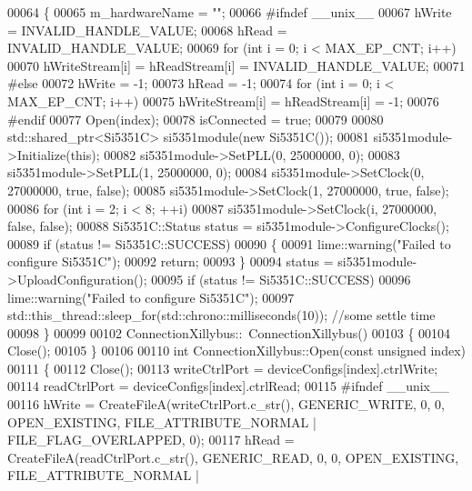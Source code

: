 \begin{DoxyCode}
00064 \{
00065     m\_hardwareName = \textcolor{stringliteral}{""};
00066 \textcolor{preprocessor}{#ifndef \_\_unix\_\_}
00067     hWrite = INVALID\_HANDLE\_VALUE;
00068     hRead = INVALID\_HANDLE\_VALUE;
00069     \textcolor{keywordflow}{for} (\textcolor{keywordtype}{int} i = 0; i < MAX\_EP\_CNT; i++)
00070         hWriteStream[i] = hReadStream[i] = INVALID\_HANDLE\_VALUE;
00071 \textcolor{preprocessor}{#else}
00072     hWrite = -1;
00073     hRead = -1;
00074     \textcolor{keywordflow}{for} (\textcolor{keywordtype}{int} i = 0; i < MAX\_EP\_CNT; i++)
00075         hWriteStream[i] = hReadStream[i] = -1;
00076 \textcolor{preprocessor}{#endif}
00077     Open(index);
00078     isConnected = \textcolor{keyword}{true};
00079 
00080     std::shared\_ptr<Si5351C> si5351module(\textcolor{keyword}{new} Si5351C());
00081     si5351module->Initialize(\textcolor{keyword}{this});
00082     si5351module->SetPLL(0, 25000000, 0);
00083     si5351module->SetPLL(1, 25000000, 0);
00084     si5351module->SetClock(0, 27000000, \textcolor{keyword}{true}, \textcolor{keyword}{false});
00085     si5351module->SetClock(1, 27000000, \textcolor{keyword}{true}, \textcolor{keyword}{false});
00086     \textcolor{keywordflow}{for} (\textcolor{keywordtype}{int} i = 2; i < 8; ++i)
00087         si5351module->SetClock(i, 27000000, \textcolor{keyword}{false}, \textcolor{keyword}{false});
00088     Si5351C::Status status = si5351module->ConfigureClocks();
00089     \textcolor{keywordflow}{if} (status != Si5351C::SUCCESS)
00090     \{
00091         lime::warning(\textcolor{stringliteral}{"Failed to configure Si5351C"});
00092         \textcolor{keywordflow}{return};
00093     \}
00094     status = si5351module->UploadConfiguration();
00095     \textcolor{keywordflow}{if} (status != Si5351C::SUCCESS)
00096         lime::warning(\textcolor{stringliteral}{"Failed to configure Si5351C"});
00097     std::this\_thread::sleep\_for(std::chrono::milliseconds(10)); \textcolor{comment}{//some settle time}
00098 \}
00099 
00102 ConnectionXillybus::~ConnectionXillybus()
00103 \{
00104     Close();
00105 \}
00106 
00110 \textcolor{keywordtype}{int} ConnectionXillybus::Open(\textcolor{keyword}{const} \textcolor{keywordtype}{unsigned} index)
00111 \{
00112     Close();
00113     writeCtrlPort = deviceConfigs[index].ctrlWrite;
00114     readCtrlPort = deviceConfigs[index].ctrlRead;
00115 \textcolor{preprocessor}{#ifndef \_\_unix\_\_}
00116     hWrite = CreateFileA(writeCtrlPort.c\_str(), GENERIC\_WRITE, 0, 0, OPEN\_EXISTING, FILE\_ATTRIBUTE\_NORMAL |
       FILE\_FLAG\_OVERLAPPED, 0);
00117     hRead = CreateFileA(readCtrlPort.c\_str(), GENERIC\_READ, 0, 0, OPEN\_EXISTING, FILE\_ATTRIBUTE\_NORMAL | 

\end{DoxyCode}
